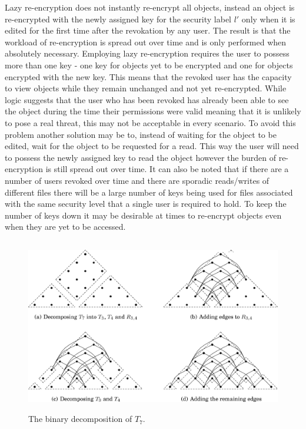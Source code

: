 \documentclass[12pt, titlepage]{article}
\begin{document}
\newline \indent Lazy re-encryption does not instantly re-encrypt all objects, instead an object is re-encrypted with the newly assigned key for the security label $l'$ only when it is edited for the first time after the revokation by any user. The result is that the workload of re-encryption is spread out over time and is only performed when absolutely necessary. Employing lazy re-encryption requires the user to possess more than one key - one key for objects yet to be encrypted and one for objects encrypted with the new key.\cite{lazyEncryption} This means that the revoked user has the capacity to view objects while they remain unchanged and not yet re-encrypted. While logic suggests that the user who has been revoked has already been able to see the object during the time their permissions were valid meaning that it is unlikely to pose a real threat, this may not be acceptable in every scenario. To avoid this problem another solution may be to, instead of waiting for the object to be edited, wait for the object to be requested for a read. This way the user will need to possess the newly assigned key to read the object however the burden of re-encryption is still spread out over time. It can also be noted that if there are a number of users revoked over time and there are sporadic reads/writes of different files there will be a large number of keys being used for files associated with the same security level that a single user is required to hold. To keep the number of keys down it may be desirable at times to re-encrypt objects even when they are yet to be accessed.

\begin{figure}
\centerline{\includegraphics[height=3.0in,width=6in,angle=0]{binarydecompo.pdf}}
\caption{The binary decomposition of $T_{7}$.\cite{mainPaper}}
\label{fig:binarydecomp}
\end{figure}
\end{document}
